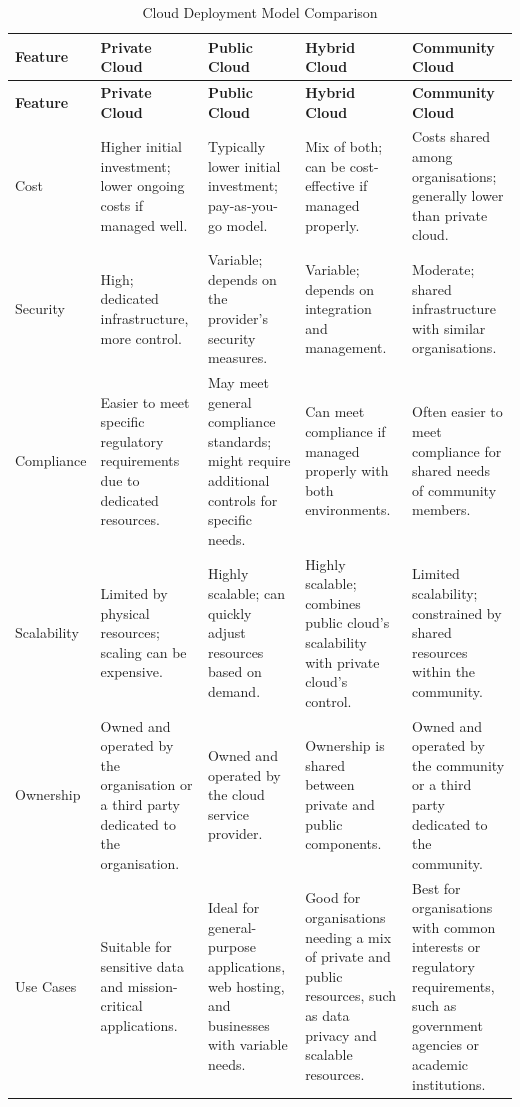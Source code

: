 \begingroup
\centering
\setlength{\tabcolsep}{6.5pt} %
\begin{longtable}{|p{2cm}| p{3cm} |p{3cm} |p{3cm}|p{3cm}|}
\caption{Cloud Deployment Model Comparison}
    \label{table:cloud_comp}
\hline
\rowcolor{grey!15}
\textbf{Feature} & \textbf{Private Cloud} & \textbf{Public Cloud} & \textbf{Hybrid Cloud} & \textbf{Community Cloud} \\
\hline
\endfirsthead
\hline
\rowcolor{grey!15}
\textbf{Feature} & \textbf{Private Cloud} & \textbf{Public Cloud} & \textbf{Hybrid Cloud} & \textbf{Community Cloud} \\
\hline
\endhead
\hline
\endfoot
\hline
\endlastfoot

Cost & Higher initial investment; lower ongoing costs if managed well. & Typically lower initial investment; pay-as-you-go model. & Mix of both; can be cost-effective if managed properly. & Costs shared among organisations; generally lower than private cloud. \\
\hline
Security & High; dedicated infrastructure, more control. & Variable; depends on the provider’s security measures. & Variable; depends on integration and management. & Moderate; shared infrastructure with similar organisations. \\
\hline
Compliance & Easier to meet specific regulatory requirements due to dedicated resources. & May meet general compliance standards; might require additional controls for specific needs. & Can meet compliance if managed properly with both environments. & Often easier to meet compliance for shared needs of community members. \\
\hline
Scalability & Limited by physical resources; scaling can be expensive. & Highly scalable; can quickly adjust resources based on demand. & Highly scalable; combines public cloud's scalability with private cloud’s control. & Limited scalability; constrained by shared resources within the community. \\
\hline
Ownership & Owned and operated by the organisation or a third party dedicated to the organisation. & Owned and operated by the cloud service provider. & Ownership is shared between private and public components. & Owned and operated by the community or a third party dedicated to the community. \\
\hline
Use Cases & Suitable for sensitive data and mission-critical applications. & Ideal for general-purpose applications, web hosting, and businesses with variable needs. & Good for organisations needing a mix of private and public resources, such as data privacy and scalable resources. & Best for organisations with common interests or regulatory requirements, such as government agencies or academic institutions. \\

\end{longtable}
